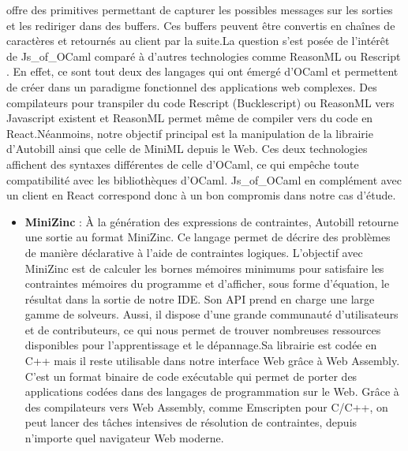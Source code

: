 \documentclass[12pt]{article}
\begin{document}
\begin{itemize}
                  offre des primitives permettant de capturer les possibles messages sur
                  les sorties et les rediriger dans des buffers. Ces buffers peuvent
                  être convertis en chaînes de caractères et retournés au client par la
                  suite.\newline  La question s'est posée de l'intérêt de Js\_of\_OCaml
                  comparé à d'autres technologies comme ReasonML
                  \cite{reasonml} ou Rescript
                  \cite{rescript}. En effet, ce sont tout
                  deux des langages qui ont émergé d'OCaml et permettent de créer dans
                  un paradigme fonctionnel des applications web complexes. Des
                  compilateurs pour transpiler du code Rescript (Bucklescript) ou
                  ReasonML vers Javascript existent et ReasonML permet même de compiler
                  vers du code en React.\newline  Néanmoins, notre objectif principal
                  est la manipulation de la librairie d'Autobill ainsi que celle de
                  MiniML depuis le Web. Ces deux technologies affichent des syntaxes
                  différentes de celle d'OCaml, ce qui empêche toute compatibilité avec
                  les bibliothèques d'OCaml. Js\_of\_OCaml en complément avec un client
                  en React correspond donc à un bon compromis dans notre cas d'étude.
      \end{itemize}
      \begin{itemize}
            \item
                  \textbf{MiniZinc} \cite{minizinc} : À la
                  génération des expressions de contraintes, Autobill retourne une
                  sortie au format MiniZinc. Ce langage permet de décrire des problèmes
                  de manière déclarative à l'aide de contraintes logiques. L'objectif
                  avec MiniZinc est de calculer les bornes mémoires minimums pour
                  satisfaire les contraintes mémoires du programme et d'afficher, sous
                  forme d'équation, le résultat dans la sortie de notre IDE. Son API
                  prend en charge une large gamme de solveurs. Aussi, il dispose d'une
                  grande communauté d'utilisateurs et de contributeurs, ce qui nous
                  permet de trouver nombreuses ressources disponibles pour
                  l'apprentissage et le dépannage.\newline  Sa librairie est codée en
                  C++ mais il reste utilisable dans notre interface Web grâce à Web
                  Assembly. C'est un format binaire de code exécutable qui permet de
                  porter des applications codées dans des langages de programmation sur
                  le Web. Grâce à des compilateurs vers Web Assembly, comme Emscripten
                  pour C/C++, on peut lancer des tâches intensives de résolution de
                  contraintes, depuis n'importe quel navigateur Web moderne.
      \end{itemize}
\fi
\pagebreak
\end{document}
